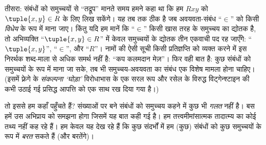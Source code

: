 \documentclass[../../../include/open-logic-section]{subfiles}
\begin{document}
तीसरा: संबंधों को समुच्चयों से ``तद्रूप'' मानते समय हमने कहा था कि हम
$Rxy$ को $\tuple{x,y} \in R$ के लिए लिख सकेंगे। यह तब तक ठीक है जब
अवयवता-संबंध ``$\in$'' को किसी \emph{विधेय} के रूप में माना जाए। किंतु यदि हम
मानें कि ``$\in$'' किसी खास तरह के समुच्चय का द्योतक है, तो अभिव्यक्ति
``$\tuple{x,y} \in R$'' में केवल समुच्चयों के द्योतक तीन एकवाची पद रह जाएँगे:
``$\tuple{x,y}$'', ``$\in$'', और ``$R$''। नामों की ऐसी सूची किसी प्रतिज्ञप्ति
को व्यक्त करने में इस निरर्थक शब्द-माला से अधिक समर्थ नहीं है: ``कप कलमदान
मेज़''। फिर वही बात है: कुछ संबंधों को समुच्चयों के रूप में माना जा सके, तब भी
समुच्चय-अवयवता का संबंध एक विशेष मामला होना चाहिए। (इसमें फ़्रेगे के
\emph{संकल्पना ‘घोड़ा’} विरोधाभास के एक सरल रूप और रसेल के विरुद्ध
विट्गेन्श्टाइन की कभी उठाई गई प्रसिद्ध आपत्ति को एक साथ रख दिया गया है।)

तो इससे हम कहाँ पहुँचते हैं? संख्याओं पर बने संबंधों को समुच्चय कहने में कुछ
भी \emph{गलत} नहीं है। बस हमें उस अभिप्राय को समझना होगा जिसमें यह बात कही गई
है। हम तत्त्वमीमांसात्मक तादात्म्य का कोई तथ्य नहीं कह रहे हैं। हम केवल यह
देख रहे हैं कि कुछ संदर्भों में हम (कुछ) संबंधों को कुछ समुच्चयों के रूप में
\emph{बरत} सकते हैं (और बरतेंगे)।
\end{document}
